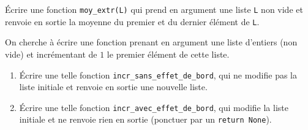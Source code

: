 \exer{}
\setcounter{numques}{0}

\question{} \'Ecrire une fonction \texttt{moy\_extr(L)} qui prend en argument une liste \texttt{L} non vide et renvoie en sortie la moyenne du premier et du dernier élément de \texttt{L}.

\question{}On cherche à écrire une fonction prenant en argument une liste d'entiers (non vide) et incrémentant de $1$ le premier élément de cette liste.
\begin{enumerate}[label=\emph{\alph*)}]
  \item \'Ecrire une telle fonction \texttt{incr\_sans\_effet\_de\_bord}, qui ne modifie pas la liste initiale et renvoie en sortie une nouvelle liste.
  \item \'Ecrire une telle fonction \texttt{incr\_avec\_effet\_de\_bord}, qui modifie la liste initiale et ne renvoie rien en sortie (ponctuer par un \texttt{return None}).
\end{enumerate}
